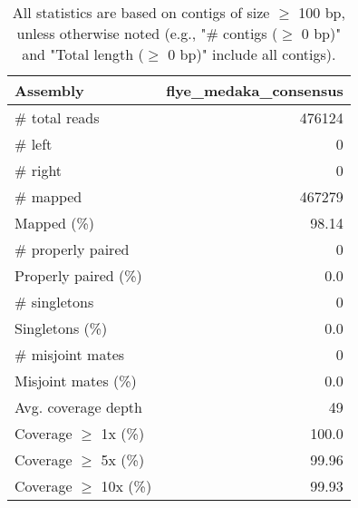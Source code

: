 \documentclass[12pt,a4paper]{article}
\begin{document}
\begin{table}[ht]
\begin{center}
\caption{All statistics are based on contigs of size $\geq$ 100 bp, unless otherwise noted (e.g., "\# contigs ($\geq$ 0 bp)" and "Total length ($\geq$ 0 bp)" include all contigs).}
\begin{tabular}{|l*{1}{|r}|}
\hline
Assembly & flye\_medaka\_consensus \\ \hline
\# total reads & 476124 \\ \hline
\# left & 0 \\ \hline
\# right & 0 \\ \hline
\# mapped & 467279 \\ \hline
Mapped (\%) & 98.14 \\ \hline
\# properly paired & 0 \\ \hline
Properly paired (\%) & 0.0 \\ \hline
\# singletons & 0 \\ \hline
Singletons (\%) & 0.0 \\ \hline
\# misjoint mates & 0 \\ \hline
Misjoint mates (\%) & 0.0 \\ \hline
Avg. coverage depth & 49 \\ \hline
Coverage $\geq$ 1x (\%) & 100.0 \\ \hline
Coverage $\geq$ 5x (\%) & 99.96 \\ \hline
Coverage $\geq$ 10x (\%) & 99.93 \\ \hline
\end{tabular}
\end{center}
\end{table}
\end{document}
